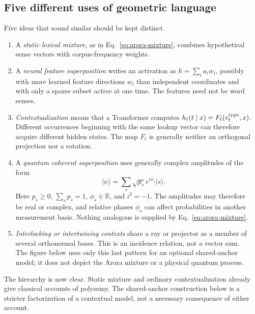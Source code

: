 \documentclass[
  aps,
  reprint,
  superscriptaddress,
  floatfix,
  nofootinbib,
  longbibliography
]{revtex4-2}
\newcommand{\R}{\mathbb{R}}
\begin{document}
\subsection{Five different uses of geometric language}
\label{sec:five-superpositions}

Five ideas that sound similar should be kept distinct.

\begin{enumerate}
\item A \emph{static lexical mixture}, as in
Eq.~\eqref{eq:arora-mixture}, combines hypothetical sense vectors with
corpus-frequency weights.

\item A \emph{neural feature superposition} writes an activation as
$h=\sum_i a_iw_i$, possibly with more learned feature directions $w_i$ than
independent coordinates and with only a sparse subset active at one time.  The
features need not be word senses.

\item \emph{Contextualization} means that a Transformer computes
$h_\ell(t\mid x)=F_\ell(v_t^{\rm type},x)$.  Different occurrences beginning with the
same lookup vector can therefore acquire different hidden states.  The map
$F_\ell$ is generally neither an orthogonal projection nor a rotation.

\item A \emph{quantum coherent superposition} uses generally complex
amplitudes of the form
\[
\lvert\psi\rangle
=\sum_s\sqrt{p_s}e^{i\phi_s}\lvert s\rangle .
\]
Here $p_s\geq0$, $\sum_s p_s=1$, $\phi_s\in\R$, and $i^2=-1$.  The amplitudes
may therefore be real or complex, and relative phases $\phi_s$ can affect
probabilities in another measurement basis.  Nothing analogous is supplied by
Eq.~\eqref{eq:arora-mixture}.

\item \emph{Interlocking or intertwining contexts} share a ray or projector
as a member of several orthonormal bases.  This is an incidence relation, not
a vector sum.  The figure below uses only this last pattern for an optional
shared-anchor model; it does not depict the Arora mixture or a physical quantum
process.
\end{enumerate}

The hierarchy is now clear.  Static mixture and ordinary contextualization
already give classical accounts of polysemy.  The shared-anchor construction
below is a stricter factorization of a contextual model, not a necessary
consequence of either account.
\end{document}
